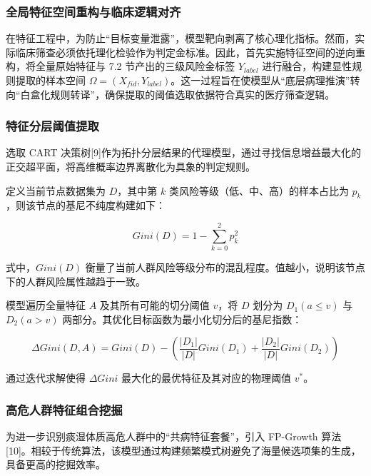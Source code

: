 \documentclass[12pt]{article}
\begin{document}
	\subsubsection{全局特征空间重构与临床逻辑对齐}
	{\songti{}
		在特征工程中，为防止“目标变量泄露”，模型靶向剥离了核心理化指标。然而，实际临床筛查必须依托理化检验作为判定金标准。因此，首先实施特征空间的逆向重构，将全量原始特征与 7.2 节产出的三级风险金标签 $Y_{label}$ 进行融合，构建显性规则提取的样本空间 $\Omega=(X_{fid},Y_{label})$。这一过程旨在使模型从“底层病理推演”转向“白盒化规则转译”，确保提取的阈值选取依据符合真实的医疗筛查逻辑。
		\par}
	
	\subsubsection{特征分层阈值提取}
	{\songti{}
		选取 CART 决策树[9]作为拓扑分层结果的代理模型，通过寻找信息增益最大化的正交超平面，将高维概率边界离散化为具象的判定规则。
		\par}
	
	{\songti{}
		定义当前节点数据集为 $D$，其中第 $k$ 类风险等级（低、中、高）的样本占比为 $p_k$，则该节点的基尼不纯度构建如下：
		\par}
	
	\begin{equation}
		Gini(D)=1-\sum_{k=0}^{2} p_k^2
	\end{equation}
	
	{\songti{}
		式中，$Gini(D)$ 衡量了当前人群风险等级分布的混乱程度。值越小，说明该节点下的人群风险属性越趋于一致。
		\par}
	
	{\songti{}
		模型遍历全量特征 $A$ 及其所有可能的切分阈值 $v$，将 $D$ 划分为 $D_1(a \le v)$ 与 $D_2(a > v)$ 两部分。其优化目标函数为最小化切分后的基尼指数：
		\par}
	
	\begin{equation}
		\Delta Gini(D, A) = Gini(D) - \left( \frac{|D_1|}{|D|} Gini(D_1) + \frac{|D_2|}{|D|} Gini(D_2) \right)
	\end{equation}
	
	{\songti{}
		通过迭代求解使得 $\Delta Gini$ 最大化的最优特征及其对应的物理阈值 $v^*$。
		\par}
	
	\subsubsection{高危人群特征组合挖掘}
	{\songti{}
		为进一步识别痰湿体质高危人群中的“共病特征套餐”，引入 FP-Growth 算法[10]。相较于传统算法，该模型通过构建频繁模式树避免了海量候选项集的生成，具备更高的挖掘效率。
		\par}
	
\end{document}

